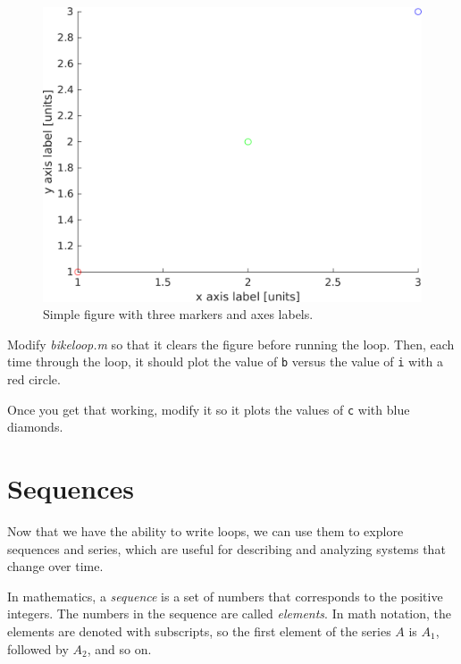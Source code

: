 \begin{figure}[h]
    \centerline{\includegraphics[scale=0.8]{images/fig03_ex.png}}
    \caption{Simple figure with three markers and axes labels.}
    \label{fig:ex}
\end{figure}

\begin{ex}
Modify \emph{bike\textunderscore loop.m} so that it clears the figure before running the loop.  Then, each time through the loop, it should plot the value of \lstinline{b} versus the value of \lstinline{i} with a red circle.

Once you get that working, modify it so it plots the values of \lstinline{c} with blue diamonds.
\end{ex}


\section{Sequences}

Now that we have the ability to write loops, we can use them to explore sequences and series, which are useful for describing and analyzing systems that change over time.

In mathematics, a \emph{sequence} is a set of numbers that corresponds to the positive integers.  The numbers in the sequence are called \emph{elements}.  In math notation, the elements are denoted with subscripts, so the first element of the series $A$ is
$A_1$, followed by $A_2$, and so on.


